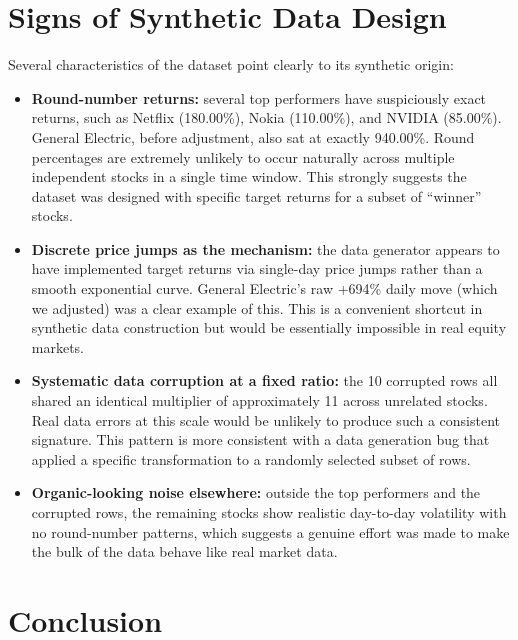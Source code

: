 \section{Signs of Synthetic Data Design}
\label{sec:synthetic}

Several characteristics of the dataset point clearly to its synthetic origin:

\begin{itemize}
    \item \textbf{Round-number returns:} several top performers have suspiciously exact returns, such as Netflix (180.00\%), Nokia (110.00\%), and NVIDIA (85.00\%). General Electric, before adjustment, also sat at exactly 940.00\%. Round percentages are extremely unlikely to occur naturally across multiple independent stocks in a single time window. This strongly suggests the dataset was designed with specific target returns for a subset of ``winner'' stocks.

    \item \textbf{Discrete price jumps as the mechanism:} the data generator appears to have implemented target returns via single-day price jumps rather than a smooth exponential curve. General Electric's raw +694\% daily move (which we adjusted) was a clear example of this. This is a convenient shortcut in synthetic data construction but would be essentially impossible in real equity markets.

    \item \textbf{Systematic data corruption at a fixed ratio:} the 10 corrupted rows all shared an identical multiplier of approximately 11 across unrelated stocks. Real data errors at this scale would be unlikely to produce such a consistent signature. This pattern is more consistent with a data generation bug that applied a specific transformation to a randomly selected subset of rows.

    \item \textbf{Organic-looking noise elsewhere:} outside the top performers and the corrupted rows, the remaining stocks show realistic day-to-day volatility with no round-number patterns, which suggests a genuine effort was made to make the bulk of the data behave like real market data.
\end{itemize}

\section{Conclusion}
\label{sec:conclusion}

